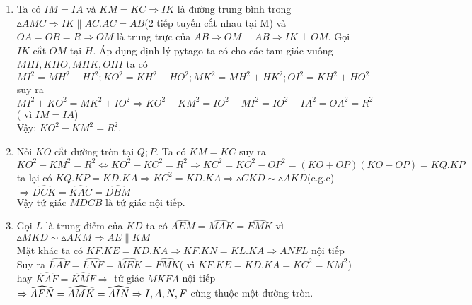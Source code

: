 \begin{ex}
{\begin{center}
   
    		\end{center}
    	\begin{enumerate}
    		\item Ta có $IM=IA$ và $KM=KC\Rightarrow IK$ là đường trung bình trong $\vartriangle AMC\Rightarrow IK\parallel AC. AC=AB $(2 tiếp tuyến cắt nhau tại M) và $OA=OB=R\Rightarrow OM$ là trung trực của $AB\Rightarrow OM \perp AB\Rightarrow IK\perp OM$. Gọi $IK$ cắt $OM$ tại $H$. Áp dụng định lý pytago ta có cho các tam giác vuông $MHI,KHO,MHK,OHI$ ta có\\
    	$MI^2=MH^2+HI^2;KO^2=KH^2+HO^2;MK^2=MH^2+HK^2;OI^2=KH^2+HO^2 $\\ suy ra $MI^2+KO^2=MK^2+IO^2\Rightarrow KO^2-KM^2=IO^2-MI^2=IO^2-IA^2=OA^2=R^2$( vì $IM=IA$)\\
    	Vậy: $KO^2-KM^2=R^2$.
    	\item Nối $KO$ cắt đường tròn tại $Q;P$. Ta có $KM=KC$ suy ra $ KO^2-KM^2=R^2\Leftrightarrow KO^2-KC^2=R^2\Rightarrow KC^2=KO^2-OP^2=(KO+OP)(KO-OP)=KQ.KP$\\
    	ta lại có $KQ.KP=KD.KA\Rightarrow KC^2=KD.KA\Rightarrow \vartriangle CKD\sim\vartriangle AKD $(c.g.c)\\
    	$\Rightarrow \widehat{DCK}=\widehat{KAC}=\widehat{DBM}$\\
    	Vậy tứ giác $MDCB$ là tứ giác nội tiếp.
    	\item  Gọi $ L$ là trung điẻm của $KD$ ta có $\widehat{AEM}=\widehat{MAK}=\widehat{EMK} $ vì $\vartriangle MKD\sim\vartriangle AKM\Rightarrow AE\parallel KM $\\
    	Mặt khác ta có $KF.KE=KD.KA\Rightarrow KF.KN=KL.KA\Rightarrow ANFL$ nội tiếp\\
    	Suy ra $\widehat{LAF}=\widehat{LNF}=\widehat{MEK}=\widehat{FMK} $( vì $KF.KE=KD.KA=KC^2=KM^2$) hay $\widehat{KAF}=\widehat{KMF}\Rightarrow$ tứ giác $ MKFA$ nội tiếp $\Rightarrow\widehat{AFN}=\widehat{AMK}=\widehat{AIN}\\\Rightarrow I,A,N,F$ cùng thuộc một đường tròn.
    	\end{enumerate}
    }
\end{ex}


